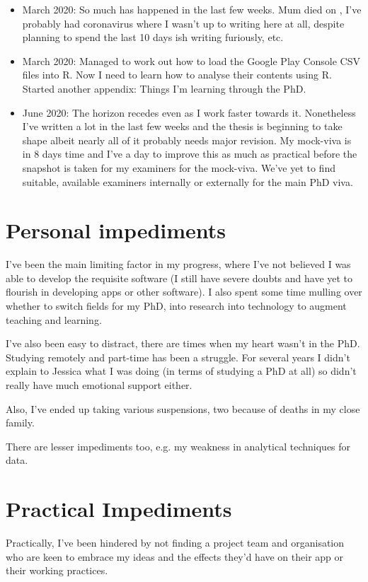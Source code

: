 \begin{itemize}
    \item {} March 2020: So much has happened in the last few weeks. Mum died on , I've probably had coronavirus where I wasn't up to writing here at all, despite planning to spend the last 10 days ish writing furiously, etc.
    \item {} March 2020: Managed to work out how to load the Google Play Console CSV files into R. Now I need to learn how to analyse their contents using R. Started another appendix: Things I'm learning through the PhD. 
    \item {} June 2020: The horizon recedes even as I work faster towards it. Nonetheless I've written a lot in the last few weeks and the thesis is beginning to take shape albeit nearly all of it probably needs major revision. My mock-viva is in 8 days time and I've a day to improve this as much as practical before the snapshot is taken for my examiners for the mock-viva. We've yet to find suitable, available examiners internally or externally for the main PhD viva.
\end{itemize}

\section{Personal impediments}
I've been the main limiting factor in my progress, where I've not believed I was able to develop the requisite software (I still have severe doubts and have yet to flourish in developing apps or other software). I also spent some time mulling over whether to switch fields for my PhD, into research into technology to augment teaching and learning. 

I've also been easy to distract, there are times when my heart wasn't in the PhD. Studying remotely and part-time has been a struggle. For several years I didn't explain to Jessica what I was doing (in terms of studying a PhD at all) so didn't really have much emotional support either.

Also, I've ended up taking various suspensions, two because of deaths in my close family.

There are lesser impediments too, e.g. my weakness in analytical techniques for data. 

\section{Practical Impediments}
Practically, I've been hindered by not finding a project team and organisation who are keen to embrace my ideas and the effects they'd have on their app or their working practices.

